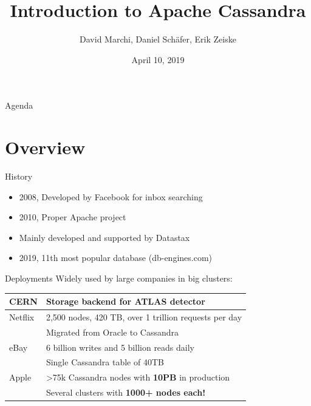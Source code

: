 \documentclass[
  10pt
]{beamer}
\title{Introduction to Apache Cassandra}
\subtitle{}
\date{April 10, 2019}
\author{David Marchi, Daniel Schäfer, Erik Zeiske}
\begin{document}
\maketitle

\begin{frame}{Agenda}
  \tableofcontents[pausesections]
\end{frame}

\section{Overview}  %

\begin{frame}{History}
  \begin{itemize}
    \item 2008, Developed by Facebook for inbox searching
    \item 2010, Proper Apache project
    \item Mainly developed and supported by Datastax
    \item 2019, 11th most popular database (db-engines.com)
  \end{itemize}
\end{frame}

\begin{frame}{Deployments}
  Widely used by large companies in big clusters:

  \begin{tabular}{@{}ll}
    \hline
    CERN    & Storage backend for ATLAS detector \\
    \hline
    Netflix & 2,500 nodes, 420 TB, over 1 trillion requests per day \\
            & Migrated from Oracle to Cassandra \\
    \hline
    eBay    & 6 billion writes and 5 billion reads daily \\
            & Single Cassandra table of 40TB \\
    \hline
    Apple   & >75k Cassandra nodes with \textbf{10PB} in production \\
            & Several clusters with \textbf{1000+ nodes each!} \\
    \hline
  \end{tabular}

\end{frame}
\end{document}
